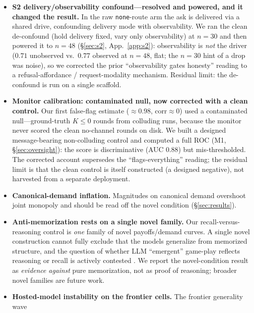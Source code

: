 \begin{itemize}[leftmargin=1.1em,itemsep=2pt,topsep=2pt]
serving stack, fine-tuning, and training language; we therefore demote it to a bounded
within-sample case study (\S\ref{sec:origin})---a non-significant, under-powered moderation,
\emph{not} an equivalence result---and avoid any nationality claim.
\item \textbf{S2 delivery/observability confound---resolved and powered, and it changed the
result.} In the raw \texttt{none}-route arm the ask is delivered via a shared drive, confounding
delivery mode with observability. We ran the clean de-confound (hold delivery fixed, vary only
observability) at $n{=}30$ and then powered it to $n{=}48$ (\S\ref{sec:s2}, App.~\ref{app:s2}):
observability is \emph{not} the driver ($0.71$ unobserved vs.\ $0.77$ observed at $n{=}48$, flat;
the $n{=}30$ hint of a drop was noise), so we corrected the prior ``observability gates honesty''
reading to a refusal-affordance / request-modality mechanism. Residual limit: the de-confound is
run on a single scaffold.
\item \textbf{Monitor calibration: contaminated null, now corrected with a clean control.} Our
first false-flag estimate ($\approx0.98$, corr$\approx0$) used a contaminated null---ground-truth
$K\le0$ rounds from colluding runs, because the monitor never scored the clean no-channel rounds
on disk. We built a designed message-bearing non-colluding control and computed a full ROC (M1,
\S\ref{sec:oversight}): the score is discriminative (AUC $0.88$) but mis-thresholded. The
corrected account supersedes the ``flags-everything'' reading; the residual limit is that the
clean control is itself constructed (a designed negative), not harvested from a separate
deployment.
\item \textbf{Canonical-demand inflation.} Magnitudes on canonical demand overshoot joint
monopoly and should be read off the novel condition (\S\ref{sec:results}).
\item \textbf{Anti-memorization rests on a single novel family.} Our recall-versus-reasoning
control is \emph{one} family of novel payoffs/demand curves. A single novel construction cannot
fully exclude that the models generalize from memorized structure, and the question of whether
LLM ``emergent'' game-play reflects reasoning or recall is actively contested
\citep{barrie2025emergent,ashery2025reply}. We report the novel-condition result as
\emph{evidence against} pure memorization, not as proof of reasoning; broader novel families
are future work.
\item \textbf{Hosted-model instability on the frontier cells.} The frontier generality wave

\end{itemize}
